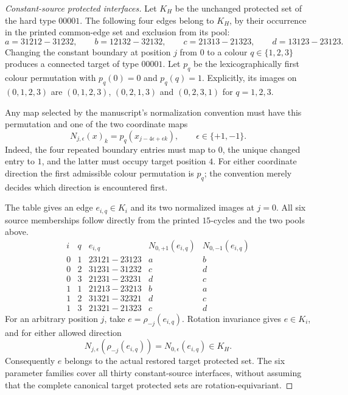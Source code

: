 \begin{proof}[Constant-source protected interfaces]
Let $K_H$ be the unchanged protected set of the hard type $00001$.
The following four edges belong to $K_H$, by their occurrence in the
printed common-edge set and exclusion from its pool:
\[
a=31212\!-31232,\qquad b=12132\!-32132,\qquad
c=21313\!-21323,\qquad d=13123\!-23123.
\]
Changing the constant boundary at position $j$ from $0$ to a colour
$q\in\{1,2,3\}$ produces a connected target of type $00001$.
Let $p_q$ be the lexicographically first colour permutation with
$p_q(0)=0$ and $p_q(q)=1$. Explicitly, its images on $(0,1,2,3)$ are
$(0,1,2,3)$, $(0,2,1,3)$ and $(0,2,3,1)$ for $q=1,2,3$.

Any map selected by the manuscript's normalization convention must
have this permutation and one of the two coordinate maps
\[
 N_{j,\epsilon}(x)_k=p_q(x_{j-4\epsilon+\epsilon k}),
                    \qquad \epsilon\in\{+1,-1\}.
\]
Indeed, the four repeated boundary entries must map to $0$, the unique
changed entry to $1$, and the latter must occupy target position $4$.
For either coordinate direction the first admissible colour permutation
is $p_q$; the convention merely decides which direction is encountered first.

The table gives an edge $e_{i,q}\in K_i$ and its two normalized images
at $j=0$. All six source memberships follow directly from the printed
$15$-cycles and the two pools above.
\[
\begin{array}{cc|c|cc}
i&q&e_{i,q}&N_{0,+1}(e_{i,q})&N_{0,-1}(e_{i,q})\\ \hline
0&1&23121\!-23123&a&b\\
0&2&31231\!-31232&c&d\\
0&3&21231\!-23231&d&c\\
1&1&21213\!-23213&b&a\\
1&2&31321\!-32321&d&c\\
1&3&21321\!-21323&c&d
\end{array}
\]
For an arbitrary position $j$, take $e=\rho_{-j}(e_{i,q})$.
Rotation invariance gives $e\in K_i$, and for either allowed direction
\[
 N_{j,\epsilon}(\rho_{-j}(e_{i,q}))
                 =N_{0,\epsilon}(e_{i,q})\in K_H.
\]
Consequently $e$ belongs to the actual restored target protected set.
The six parameter families cover all thirty constant-source interfaces,
without assuming that the complete canonical target protected sets
are rotation-equivariant.
\end{proof}

